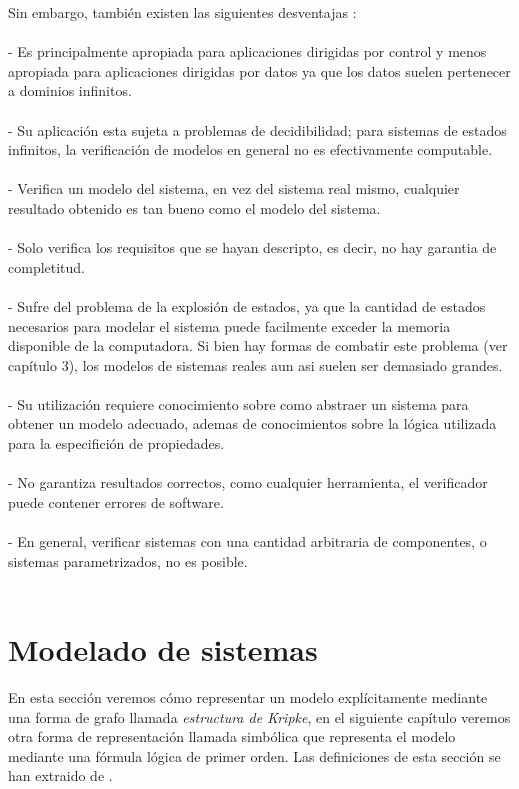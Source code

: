 Sin embargo, también existen las siguientes desventajas \cite{Baier:2}:\\
\\
- Es principalmente apropiada para aplicaciones dirigidas por control y menos apropiada para aplicaciones dirigidas por datos ya que los datos suelen pertenecer a dominios infinitos.\\
\\
- Su aplicación esta sujeta a problemas de decidibilidad; para sistemas de estados infinitos, la verificación de modelos en general no es efectivamente computable.\\
\\
- Verifica un modelo del sistema, en vez del sistema real mismo, cualquier resultado obtenido es tan bueno como el modelo del sistema.\\
\\
- Solo verifica los requisitos que se hayan descripto, es decir, no hay garantia de completitud.\\
\\
- Sufre del problema de la explosión de estados, ya que la cantidad de estados necesarios para modelar el sistema puede facilmente exceder la memoria disponible de la computadora. Si bien hay formas de combatir este problema (ver capítulo 3), los modelos de sistemas reales aun asi suelen ser demasiado grandes.\\
\\
- Su utilización requiere conocimiento sobre como abstraer un sistema para obtener un modelo adecuado, ademas de conocimientos sobre la lógica utilizada para la especifición de propiedades.\\
\\
- No garantiza resultados correctos, como cualquier herramienta, el verificador puede contener errores de software.\\
\\
- En general, verificar sistemas con una cantidad arbitraria de componentes, o sistemas parametrizados, no es posible.\\
\\
\section{Modelado de sistemas}
En esta sección veremos cómo representar un modelo explícitamente mediante una forma de grafo llamada \emph{estructura de Kripke}, en el siguiente capítulo veremos otra forma de representación llamada simbólica que representa el modelo mediante una fórmula lógica de primer orden. Las definiciones de esta sección se han extraido de \cite{Clarke:1}.

